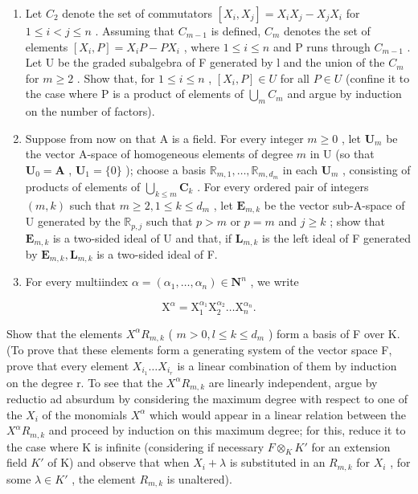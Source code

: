 \begin{enumerate}
\def\labelenumi{(\alph{enumi})}
\item
  Let \(C_{2}\) denote the set of commutators \([X_{i}, X_{j}] = X_{i}X_{j} - X_{j}X_{i}\) for \(1 \leqslant i < j \leqslant n\) . Assuming that \(C_{m-1}\) is defined, \(C_{m}\) denotes the set of elements \([X_{i}, P] = X_{i}P - PX_{i}\) , where \(1 \leqslant i \leqslant n\) and P runs through \(C_{m-1}\) . Let U be the graded subalgebra of F generated by l and the union of the \(C_{m}\) for \(m \geqslant 2\) . Show that, for \(1 \leqslant i \leqslant n\) , \([X_{i}, P] \in U\) for all \(P \in U\) (confine it to the case where P is a product of elements of \(\bigcup_{m} C_{m}\) and argue by induction on the number of factors).
\item
  Suppose from now on that A is a field. For every integer \(m \geqslant 0\) , let \(\mathbf{U}_m\) be the vector A-space of homogeneous elements of degree \(m\) in U (so that \(\mathbf{U}_0 = \mathbf{A}\) , \(\mathbf{U}_1 = \{0\}\) ); choose a basis \(\mathbb{R}_{m,1}, \ldots, \mathbb{R}_{m,d_m}\) in each \(\mathbf{U}_m\) , consisting of products of elements of \(\bigcup_{k\leqslant m}\mathbf{C}_k\) . For every ordered pair of integers \((m,k)\) such that \(m\geqslant 2,1\leqslant k\leqslant d_m\) , let \(\mathbf{E}_{m,k}\) be the vector sub-A-space of U generated by the \(\mathbb{R}_{p,j}\) such that \(p > m\) or \(p = m\) and \(j\geqslant k\) ; show that \(\mathbf{E}_{m,k}\) is a two-sided ideal of U and that, if \(\mathbf{L}_{m,k}\) is the left ideal of F generated by \(\mathbf{E}_{m,k},\mathbf{L}_{m,k}\) is a two-sided ideal of F.
\item
  For every multiindex \(\alpha = (\alpha_{1},\ldots ,\alpha_{n})\in \mathbf{N}^{n}\) , we write
\end{enumerate}

\[
\mathrm{X} ^ {\alpha} = \mathrm{X} _ {1} ^ {\alpha_ {1}} \mathrm{X} _ {2} ^ {\alpha_ {2}} \dots \mathrm{X} _ {n} ^ {\alpha_ {n}}.
\]

Show that the elements \(X^{\alpha}R_{m,k}\) ( \(m > 0, l \leqslant k \leqslant d_{m}\) ) form a basis of F over K. (To prove that these elements form a generating system of the vector space F, prove that every element \(X_{i_{1}} \ldots X_{i_{r}}\) is a linear combination of them by induction on the degree r. To see that the \(X^{\alpha}R_{m,k}\) are linearly independent, argue by reductio ad absurdum by considering the maximum degree with respect to one of the \(X_{i}\) of the monomials \(X^{\alpha}\) which would appear in a linear relation between the \(X^{\alpha}R_{m,k}\) and proceed by induction on this maximum degree; for this, reduce it to the case where K is infinite (considering if necessary \(F \otimes_{K} K'\) for an extension field \(K'\) of K) and observe that when \(X_{i} + \lambda\) is substituted in an \(R_{m,k}\) for \(X_{i}\) , for some \(\lambda \in K'\) , the element \(R_{m,k}\) is unaltered).

